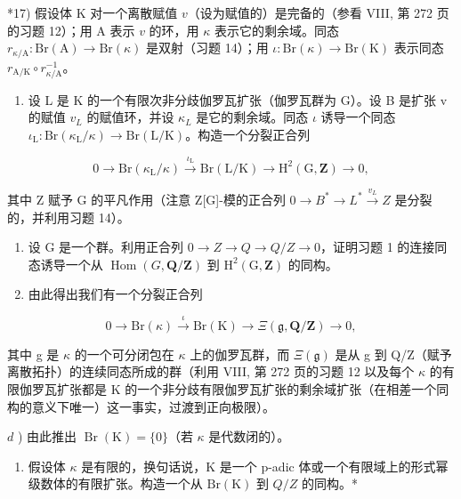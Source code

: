 *17) 假设体 K 对一个离散赋值 \(v\)（设为赋值的）是完备的（参看 VIII, 第 272 页的习题 12）；用 A 表示 \(v\) 的环，用 \(\kappa\) 表示它的剩余域。同态 \(r_{\kappa / \mathrm{A}}: \mathrm{Br}(\mathrm{A}) \to \mathrm{Br}(\kappa)\) 是双射（习题 14）；用 \(\iota: \mathrm{Br}(\kappa) \to \mathrm{Br}(\mathrm{K})\) 表示同态 \(r_{\mathrm{A / K}} \circ r_{\kappa / \mathrm{A}}^{-1}\)。

\begin{enumerate}
\def\labelenumi{\alph{enumi})}
\tightlist
\item
  设 L 是 K 的一个有限次非分歧伽罗瓦扩张（伽罗瓦群为 G）。设 B 是扩张 v 的赋值 \(v_{L}\) 的赋值环，并设 \(\kappa_{L}\) 是它的剩余域。同态 \(\iota\) 诱导一个同态 \(\iota_{\mathrm{L}} : \mathrm{Br}(\kappa_{\mathrm{L}}/\kappa) \to \mathrm{Br}(\mathrm{L}/\mathrm{K})\)。构造一个分裂正合列
\end{enumerate}

\[
0 \to \mathrm{Br} (\kappa_ {\mathrm{L}} / \kappa) \xrightarrow {\iota_ {\mathrm{L}}} \mathrm{Br} (\mathrm{L} / \mathrm{K}) \to \mathrm{H} ^ {2} (\mathrm{G}, \mathbf {Z}) \to 0,
\]

其中 Z 赋予 G 的平凡作用（注意 Z{[}G{]}-模的正合列 \(0 \rightarrow B^{*} \rightarrow L^{*} \xrightarrow{v_{L}} Z\) 是分裂的，并利用习题 14）。

\begin{enumerate}
\def\labelenumi{\alph{enumi})}
\setcounter{enumi}{1}
\item
  设 G 是一个群。利用正合列 \(0 \rightarrow Z \rightarrow Q \rightarrow Q/Z \rightarrow 0\)，证明习题 1 的连接同态诱导一个从 \(\operatorname{Hom}(G, \mathbf{Q}/\mathbf{Z})\) 到 \(\mathrm{H}^{2}(\mathrm{G}, \mathbf{Z})\) 的同构。
\item
  由此得出我们有一个分裂正合列
\end{enumerate}

\[
0 \to \mathrm{Br} (\kappa) \stackrel {\iota} {\to} \mathrm{Br} (\mathrm{K}) \to \Xi (\mathfrak {g}, \mathbf {Q} / \mathbf {Z}) \to 0,
\]

其中 g 是 \(\kappa\) 的一个可分闭包在 \(\kappa\) 上的伽罗瓦群，而 \(\Xi(\mathfrak{g})\) 是从 g 到 Q/Z（赋予离散拓扑）的连续同态所成的群（利用 VIII, 第 272 页的习题 12 以及每个 \(\kappa\) 的有限伽罗瓦扩张都是 K 的一个非分歧有限伽罗瓦扩张的剩余域扩张（在相差一个同构的意义下唯一）这一事实，过渡到正向极限）。

\(d\) ) 由此推出 \(\operatorname {Br}(\mathrm{K}) = \{0\}\)（若 \(\kappa\) 是代数闭的）。

\begin{enumerate}
\def\labelenumi{\alph{enumi})}
\setcounter{enumi}{4}
\tightlist
\item
  假设体 \(\kappa\) 是有限的，换句话说，K 是一个 p-adic 体或一个有限域上的形式幂级数体的有限扩张。构造一个从 \(\mathrm{Br}(\mathrm{K})\) 到 \(Q/Z\) 的同构。*
\end{enumerate}

